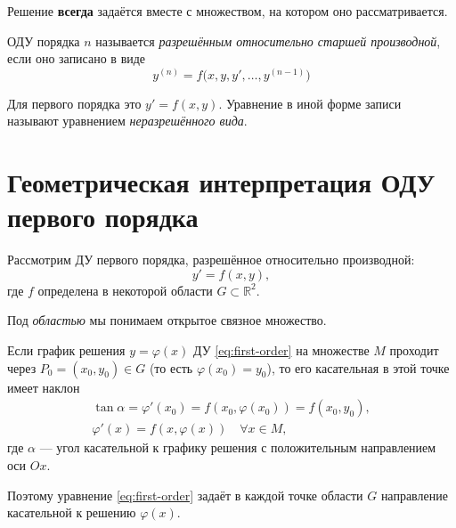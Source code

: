 \documentclass[12pt,a4paper]{article}
\numberwithin{equation}{section}
\DeclareRobustCommand{\examtag}[1]{\space{\normalfont\small\color{HSEgray}(#1)}}
\begin{document}
Решение \textbf{всегда} задаётся вместе с множеством, на котором оно рассматривается.

\begin{definitionHSE}
ОДУ порядка \(n\) называется \textit{разрешённым относительно старшей
производной}, если оно записано в виде
\[
y^{(n)}=f\bigl(x,y,y',\ldots,y^{(n-1)}\bigr)
\]
\end{definitionHSE}
Для первого порядка это \(y'=f(x,y)\). Уравнение в иной форме записи называют уравнением \textit{неразрешённого вида}.

\section[Геометрическая интерпретация ОДУ\examtag{вопрос~2}]{Геометрическая интерпретация ОДУ первого порядка\examtag{вопрос~2}}

Рассмотрим ДУ первого порядка, разрешённое относительно производной:
\begin{equation}
 y'=f(x,y),
 \label{eq:first-order}
\end{equation}
где $f$ определена в некоторой области $G\subset\mathbb{R}^2$.

\begin{remarkHSE}
Под \textit{областью} мы понимаем открытое связное множество.
\end{remarkHSE}

Если график решения $y=\varphi(x)$ ДУ \eqref{eq:first-order} на множестве \(M\) проходит через $P_0=(x_0,y_0)\in G$ (то есть \(\varphi(x_0)=y_0\)), то его касательная в этой точке имеет наклон
\begin{gather*}
\tan\alpha=\varphi'(x_0)=f(x_0,\varphi(x_0))=f(x_0,y_0),\\
\varphi'(x)=f(x,\varphi(x))\quad\forall x\in M,
\end{gather*}
где $\alpha$ --- угол касательной к графику решения с положительным направлением оси $Ox$.

Поэтому уравнение \eqref{eq:first-order} задаёт в каждой точке области \(G\) направление касательной к решению \(\varphi(x)\).
\end{document}

